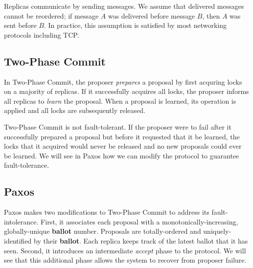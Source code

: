 \documentclass[../main.tex]{subfiles}
\begin{document}
  Replicas communicate by sending messages. We assume that delivered messages cannot be reordered;
  if message $A$ was delivered before message $B$, then $A$ was sent before $B$. In practice, this
  assumption is satisfied by most networking protocols including TCP.

  \subsection{Two-Phase Commit}
  In Two-Phase Commit, the proposer \emph{prepares} a proposal by first acquring locks on a majority
  of replicas. If it successfully acquires all locks, the proposer informs all replicas to
  \emph{learn} the proposal. When a proposal is learned, its operation is applied and all locks are
  subsequently released.

  Two-Phase Commit is not fault-tolerant. If the proposer were to fail after it successfully
  prepared a proposal but before it requested that it be learned, the locks that it acquired would
  never be released and no new proposals could ever be learned. We will see in Paxos how we can
  modify the protocol to guarantee fault-tolerance.

  \subsection{Paxos}
  Paxos makes two modifications to Two-Phase Commit to address its fault-intolerance. First, it
  associates each proposal with a monotonically-increasing, globally-unique \textbf{ballot} number.
  Proposals are totally-ordered and uniquely-identified by their \textbf{ballot}. Each replica
  keeps track of the latest ballot that it has seen. Second, it introduces an intermediate
  \emph{accept} phase to the protocol. We will see that this additional phase allows the system to
  recover from proposer failure.~\cite{paxos}
\end{document}
